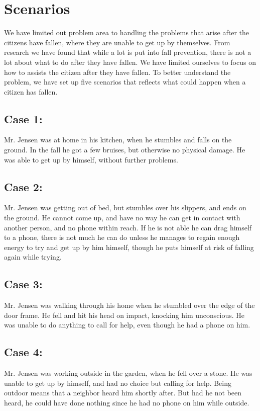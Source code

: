 \section{Scenarios} \label{preliminaries:problemanalysis:limitproblem}

We have limited out problem area to handling the problems that arise after the citizens have fallen, where they are unable to get up by themselves. From research we have found that while a lot is put into fall prevention, there is not a lot about what to do after they have fallen. We have limited ourselves to focus on how to assists the citizen after they have fallen. To better understand the problem, we have set up five scenarios that reflects what could happen when a citizen has fallen.

\subsection{Case 1:}
Mr. Jensen was at home in his kitchen, when he stumbles and falls on the ground. In the fall he got a few bruises, but otherwise no physical damage. He was able to get up by himself, without further problems.

\subsection{Case 2:}
Mr. Jensen was getting out of bed, but stumbles over his slippers, and ends on the ground. He cannot come up, and have no way he can get in contact with another person, and no phone within reach. If he is not able he can drag himself to a phone, there is not much he can do unless he manages to regain enough energy to try and get up by him himself, though he puts himself at risk of falling again while trying.

\subsection{Case 3:}
Mr. Jensen was walking through his home when he stumbled over the edge of the door frame. He fell and hit his head on impact, knocking him unconscious. He was unable to do anything to call for help, even though he had a phone on him.

\subsection{Case 4:}
Mr. Jensen was working outside in the garden, when he fell over a stone. He was unable to get up by himself, and had no choice but calling for help. Being outdoor means that a neighbor heard him shortly after. But had he not been heard, he could have done nothing since he had no phone on him while outside.

